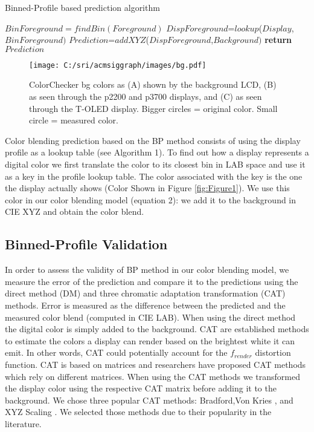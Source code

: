 \documentclass[annual]{acmsiggraph}
\begin{document}
\begin{algorithm}
\caption{Binned-Profile based prediction algorithm}
\begin{algorithmic}
	 \label{alg:1}
	\State $BinForeground=findBin(Foreground)$
    \State $DispForeground$=$lookup$($Display$,$BinForeground)$
	\State $Prediction$=$addXYZ$($DispForeground$,$Background)$
	\textbf{return}$Prediction$
	\EndProcedure
  \end{algorithmic}
\end{algorithm}

\begin{figure*}[ht]
  \centering
  \texttt{[image: C:/sri/acmsiggraph/images/bg.pdf]}
  \caption{ColorChecker bg colors as (A) shown by the background LCD, (B) as seen through the p2200 and p3700 displays, and (C) as seen through the T-OLED display. Bigger circles = original color. Small circle = measured color.}
  \label{fig:Figure6}
\end{figure*}

Color blending prediction based on the BP method consists of using the display profile as a lookup table (see Algorithm 1). To find out how a display represents a digital color we first translate the color to its closest bin in LAB space and use it as a key in the profile lookup table. The color associated with the key is the one the display actually shows (Color Shown in Figure \ref{fig:Figure1}). We use this color in our color blending model (equation 2): we add it to the background in CIE XYZ and obtain the color blend.

\subsection{Binned-Profile Validation}
In order to assess the validity of BP method in our color blending model, we measure the error of the prediction and compare it to the predictions using the direct method (DM) and three chromatic adaptation transformation (CAT) methods. Error is measured as the difference between the predicted and the measured color blend (computed in CIE LAB). When using the direct method the digital color is simply added to the background. CAT are established methods to estimate the colors a display can render based on the brightest white it can emit. In other words, CAT could potentially account for the  $f_{render}$ distortion function. CAT is based on matrices and researchers have proposed CAT methods which rely on different matrices. When using the CAT methods we transformed the display color using the respective CAT matrix before adding it to the background. We chose three popular CAT methods: Bradford,Von Kries \cite{Susstrunk:2000}, and XYZ Scaling \cite{CAT2013}. We selected those methods due to their popularity in the literature.
\end{document}
